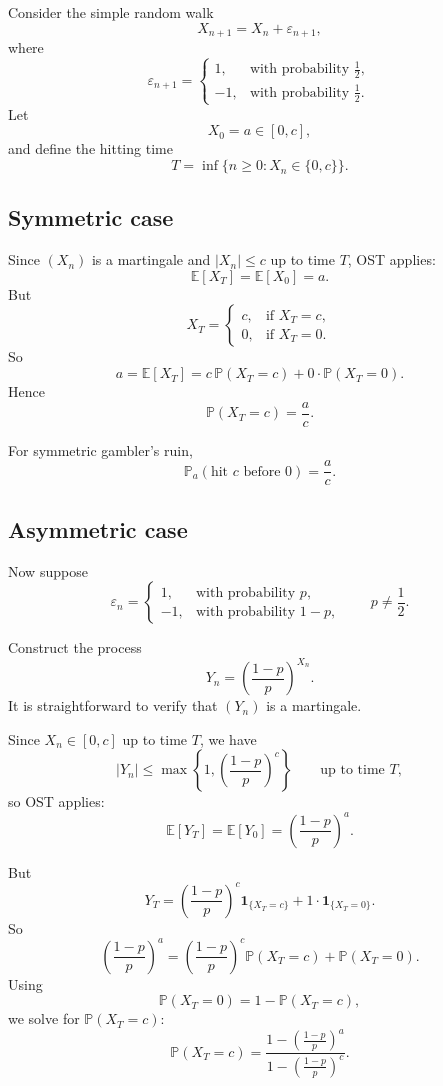 \documentclass[11pt]{article}
\theoremstyle{definition}
\begin{document}
Consider the simple random walk
\[
X_{n+1}=X_n+\varepsilon_{n+1},
\]
where
\[
\varepsilon_{n+1}=
\begin{cases}
1, & \text{with probability } \tfrac12,\\
-1, & \text{with probability } \tfrac12.
\end{cases}
\]
Let
\[
X_0=a\in[0,c],
\]
and define the hitting time
\[
T=\inf\{n\ge 0:X_n\in\{0,c\}\}.
\]

\subsection{Symmetric case}

Since \((X_n)\) is a martingale and \(|X_n|\le c\) up to time \(T\), OST applies:
\[
\mathbb E[X_T]=\mathbb E[X_0]=a.
\]
But
\[
X_T=
\begin{cases}
c, & \text{if } X_T=c,\\
0, & \text{if } X_T=0.
\end{cases}
\]
So
\[
a=\mathbb E[X_T]
=
c\,\mathbb P(X_T=c)+0\cdot \mathbb P(X_T=0).
\]
Hence
\[
\mathbb P(X_T=c)=\frac{a}{c}.
\]

\begin{keyformula}
For symmetric gambler's ruin,
\[
\mathbb P_a(\text{hit } c \text{ before } 0)=\frac{a}{c}.
\]
\end{keyformula}

\subsection{Asymmetric case}

Now suppose
\[
\varepsilon_n=
\begin{cases}
1, & \text{with probability } p,\\
-1, & \text{with probability } 1-p,
\end{cases}
\qquad p\neq \frac12.
\]

Construct the process
\[
Y_n=\left(\frac{1-p}{p}\right)^{X_n}.
\]
It is straightforward to verify that \((Y_n)\) is a martingale.

Since \(X_n\in[0,c]\) up to time \(T\), we have
\[
|Y_n|\le \max\left\{1,\left(\frac{1-p}{p}\right)^c\right\}
\qquad \text{up to time } T,
\]
so OST applies:
\[
\mathbb E[Y_T]=\mathbb E[Y_0]
=
\left(\frac{1-p}{p}\right)^a.
\]

But
\[
Y_T=
\left(\frac{1-p}{p}\right)^c \mathbf 1_{\{X_T=c\}}
+
1\cdot \mathbf 1_{\{X_T=0\}}.
\]
So
\[
\left(\frac{1-p}{p}\right)^a
=
\left(\frac{1-p}{p}\right)^c \mathbb P(X_T=c)
+
\mathbb P(X_T=0).
\]
Using
\[
\mathbb P(X_T=0)=1-\mathbb P(X_T=c),
\]
we solve for \(\mathbb P(X_T=c)\):
\[
\mathbb P(X_T=c)
=
\frac{1-\left(\frac{1-p}{p}\right)^a}
{1-\left(\frac{1-p}{p}\right)^c}.
\]
\end{document}

